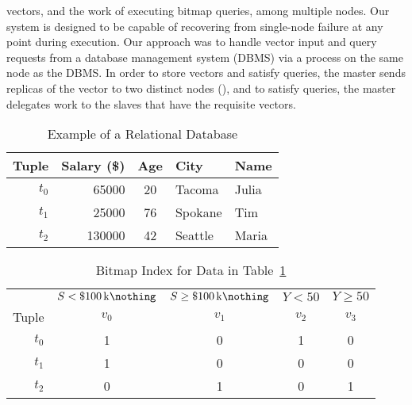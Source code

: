 vectors, and the work of executing bitmap queries, among multiple nodes. Our
system is designed to be capable of recovering from single-node failure at any
point during execution. Our approach was to handle vector input and query
requests from a database management system (DBMS) via a  process
on the same node as the DBMS. In order to store vectors and satisfy queries,
the master sends replicas of the vector to two distinct nodes (),
and to satisfy queries, the master delegates work to the slaves that have the
requisite vectors.
\par
%
\begin{table}
    \centering
    \caption{Example of a Relational Database}
    \label{table:census-relational}
    \begin{tabular}{@{}r||rcll@{}}
        \toprule
        Tuple   & Salary (\$)  & Age & City    & Name  \\
        \midrule
        \(t_0\) & \num{65000}  & 20  & Tacoma  & Julia \\
        \(t_1\) & \num{25000}  & 76  & Spokane & Tim   \\
        \(t_2\) & \num{130000} & 42  & Seattle & Maria \\
        \bottomrule
    \end{tabular}
\end{table}
%
\begin{table}
    \centering
    \caption{Bitmap Index for Data in Table~\ref{table:census-relational}}
    \label{table:census-bitmap}
    \begin{tabular}{@{}r||cc|cc@{}}
        \toprule
                & \(S < \SI{100}[\$]{\kilo\nothing}\)
                & \(S \geq \SI{100}[\$]{\kilo\nothing}\)
                & \(Y < 50\) & \(Y \geq 50\) \\
        Tuple   & \(v_0\)    & \(v_1\)       & \(v_2\)    & \(v_3\)       \\
        \midrule
        \(t_0\) & 1          & 0             & 1          & 0             \\
        \(t_1\) & 1          & 0             & 0          & 0             \\
        \(t_2\) & 0          & 1             & 0          & 1             \\
        \bottomrule
    \end{tabular}
\end{table}
